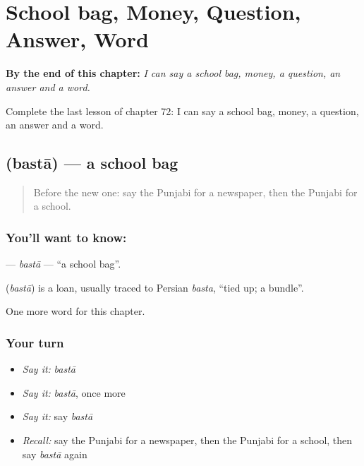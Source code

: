 
\chapter{School bag, Money, Question, Answer, Word}
\label{ch:pa-school-bag-money-question-answer-word}

\begin{chapteropening}
\textbf{By the end of this chapter:} \emph{I can say a school bag, money, a question, an answer and a word.}

Complete the last lesson of chapter 72: I can say a school bag, money, a question, an answer and a word.
\end{chapteropening}

\section[\texorpdfstring{\pa{ਬਸਤਾ} (bastā)}{ਬਸਤਾ (bastā)}]{ (bastā) — a school bag}

\label{lesson:PA-C72-basta}



\begin{quote}
Before the new one: say the Punjabi for a newspaper, then the Punjabi for a school.
\end{quote}

\subsection*{You'll want to know: }
\textbf{} — \emph{bastā} — \textquotedblleft{}a school bag\textquotedblright{}.

\begin{cousinweb}
\textbf{} (\emph{bastā}) is a loan, usually traced to Persian \emph{basta}, \textquotedblleft{}tied up; a bundle\textquotedblright{}.
\end{cousinweb}

\begin{grammarlens}[title={What you've built}]
One more word for this chapter.
\end{grammarlens}

\subsection*{Your turn}
\begin{itemize}
\raggedright
  \item \emph{Say it:} \emph{bastā}
  \item \emph{Say it:} \emph{bastā}, once more
  \item \emph{Say it:} say \emph{bastā}
  \item \emph{Recall:} say the Punjabi for a newspaper, then the Punjabi for a school, then say \emph{bastā} again
\end{itemize}

